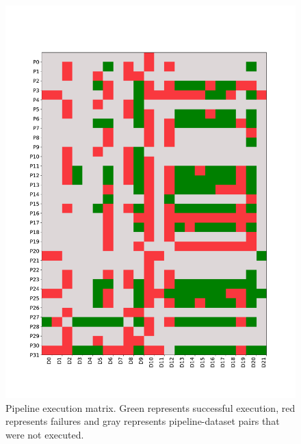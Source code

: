 \documentclass[conference]{IEEEtran}
\begin{document}

\begin{figure}%
  \includegraphics[width=\columnwidth]{figures/Pipeline Execution Level 2.pdf}
  \caption{Pipeline execution matrix. Green represents successful execution, red represents failures and gray represents pipeline-dataset pairs that were not executed. }
  \label{fig:execution_matrix}
\end{figure}
\end{document}
